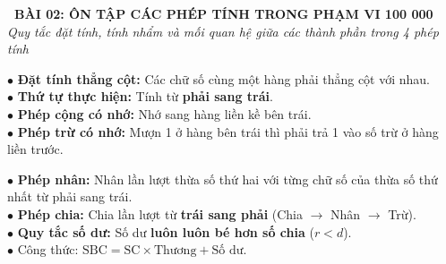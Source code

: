\documentclass[14pt,a4paper,oneside]{extbook}
\begin{document}
\noindent
\begin{tcolorbox}[
  enhanced,
  colback=teal!8!white,
  colframe=teal!80!black,
  arc=3mm, boxrule=1pt,
  left=3mm, right=3mm, top=2mm, bottom=2mm,
  halign=center
]
  {\Large\bfseries\color{teal!90!black}\faBookmark\ BÀI 02: ÔN TẬP CÁC PHÉP TÍNH TRONG PHẠM VI 100 000}\\[1.5pt]
  {\footnotesize\itshape\color{black!75} Quy tắc đặt tính, tính nhẩm và mối quan hệ giữa các thành phần trong 4 phép tính}
\end{tcolorbox}

\vspace{2.5mm}

\noindent
\begin{minipage}[t]{0.49\textwidth}
  \begin{tcolorbox}[
    enhanced,
    title={\footnotesize\bfseries\color{white}\faPlus\ Phép Cộng \& Phép Trừ},
    colback=blue!2!white,
    colframe=blue!75!black,
    arc=2.5mm, boxrule=0.8pt, top=1.8mm, bottom=1.8mm, left=2mm, right=2mm
  ]
    \footnotesize
    $\bullet$ \textbf{Đặt tính thẳng cột:} Các chữ số cùng một hàng phải thẳng cột với nhau.\\
    $\bullet$ \textbf{Thứ tự thực hiện:} Tính từ \textbf{phải sang trái}.\\
    $\bullet$ \textbf{Phép cộng có nhớ:} Nhớ sang hàng liền kề bên trái.\\
    $\bullet$ \textbf{Phép trừ có nhớ:} Mượn 1 ở hàng bên trái thì phải trả 1 vào số trừ ở hàng liền trước.
  \end{tcolorbox}
\end{minipage}%
\hfill
\begin{minipage}[t]{0.49\textwidth}
  \begin{tcolorbox}[
    enhanced,
    title={\footnotesize\bfseries\color{white}\faTimes\ Phép Nhân \& Phép Chia},
    colback=teal!2!white,
    colframe=teal!75!black,
    arc=2.5mm, boxrule=0.8pt, top=1.8mm, bottom=1.8mm, left=2mm, right=2mm
  ]
    \footnotesize
    $\bullet$ \textbf{Phép nhân:} Nhân lần lượt thừa số thứ hai với từng chữ số của thừa số thứ nhất từ phải sang trái.\\
    $\bullet$ \textbf{Phép chia:} Chia lần lượt từ \textbf{trái sang phải} (Chia $\rightarrow$ Nhân $\rightarrow$ Trừ).\\
    $\bullet$ \textbf{Quy tắc số dư:} Số dư \textbf{luôn luôn bé hơn số chia} ($r < d$).\\
    $\bullet$ Công thức: $\text{SBC} = \text{SC} \times \text{Thương} + \text{Số dư}$.
  \end{tcolorbox}
\end{minipage}
\end{document}
